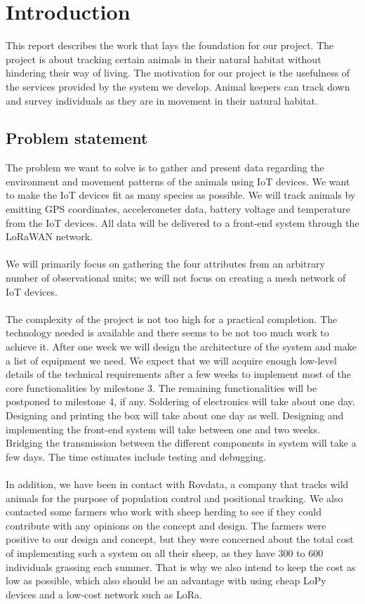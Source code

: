 \tableofcontents
\listoffigures

\clearpage

\section{Introduction}
	This report describes the work that lays the foundation for our project. The project is about tracking certain animals in their natural habitat without hindering their way of living. The motivation for our project is the usefulness of the services provided by the system we develop. Animal keepers can track down and survey individuals as they are in movement in their natural habitat.

	\subsection{Problem statement}
		The problem we want to solve is to gather and present data regarding the environment and movement patterns of the animals using IoT devices. We want to make the IoT devices fit as many species as possible. We will track animals by emitting GPS coordinates, accelerometer data, battery voltage and temperature from the IoT devices. All data will be delivered to a front-end system through the LoRaWAN network. 
		\\\\
		We will primarily focus on gathering the four attributes from an arbitrary number of observational units; we will not focus on creating a mesh network of IoT devices. 
		\\\\
		The complexity of the project is not too high for a practical completion. The technology needed is available and there seems to be not too much work to achieve it. After one week we will design the architecture of the system and make a list of equipment we need. We expect that we will acquire enough low-level details of the technical requirements after a few weeks to implement most of the core functionalities by milestone 3. The remaining functionalities will be postponed to milestone 4, if any. Soldering of electronics will take about one day. Designing and printing the box will take about one day as well. Designing and implementing the front-end system will take between one and two weeks. Bridging the transmission between the different components in system will take a few days. The time estimates include testing and debugging. 
		\\\\
		In addition, we have been in contact with Rovdata, a company that tracks wild animals for the purpose of population control and positional tracking. We also contacted some farmers who work with sheep herding to see if they could contribute with any opinions on the concept and design. The farmers were positive to our design and concept, but they were concerned about the total cost of implementing such a system on all their sheep, as they have 300 to 600 individuals grassing each summer. That is why we also intend to keep the cost as low as possible, which also should be an advantage with using cheap LoPy devices and a low-cost network such as LoRa. 


